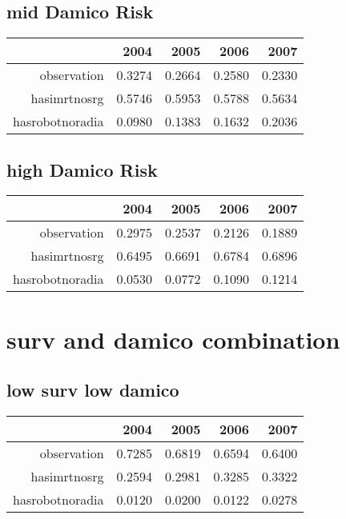 \documentclass[12pt]{report}
\begin{document}
\subsection{mid Damico Risk}
\begin{table}[ht]
\begin{center}
\begin{tabular}{rrrrr}
  \hline
 & 2004 & 2005 & 2006 & 2007 \\ 
  \hline
observation & 0.3274 & 0.2664 & 0.2580 & 0.2330 \\ 
  hasimrtnosrg & 0.5746 & 0.5953 & 0.5788 & 0.5634 \\ 
  hasrobotnoradia & 0.0980 & 0.1383 & 0.1632 & 0.2036 \\ 
   \hline
\end{tabular}
\end{center}
\end{table}

\subsection{high Damico Risk}
\begin{table}[ht]
\begin{center}
\begin{tabular}{rrrrr}
  \hline
 & 2004 & 2005 & 2006 & 2007 \\ 
  \hline
observation & 0.2975 & 0.2537 & 0.2126 & 0.1889 \\ 
  hasimrtnosrg & 0.6495 & 0.6691 & 0.6784 & 0.6896 \\ 
  hasrobotnoradia & 0.0530 & 0.0772 & 0.1090 & 0.1214 \\ 
   \hline
\end{tabular}
\end{center}
\end{table}

\pagebreak
\section{surv and damico combination}
\subsection{low surv low damico}
\begin{table}[ht]
\begin{center}
\begin{tabular}{rrrrr}
  \hline
 & 2004 & 2005 & 2006 & 2007 \\ 
  \hline
observation & 0.7285 & 0.6819 & 0.6594 & 0.6400 \\ 
  hasimrtnosrg & 0.2594 & 0.2981 & 0.3285 & 0.3322 \\ 
  hasrobotnoradia & 0.0120 & 0.0200 & 0.0122 & 0.0278 \\ 
   \hline
\end{tabular}
\end{center}
\end{table}
\end{document}
